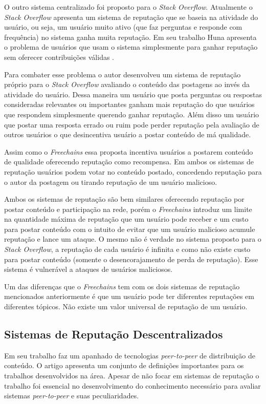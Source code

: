 \documentclass[12pt]{article}
\newcommand{\FC} {\emph{Freechains}\xspace}
\newcommand{\PtoP} {\emph{peer-to-peer}\xspace}
\begin{document}
O outro sistema centralizado foi proposto para o \emph{Stack Overflow}. Atualmente o \emph{Stack Overflow} apresenta um sistema de reputação que se baseia na atividade do usuário, ou seja, um usuário muito ativo (que faz perguntas e responde com frequência) no sistema ganha muita reputação. Em seu trabalho Huna apresenta o problema de usuários que usam o sistema simplesmente para ganhar reputação sem oferecer contribuições válidas \cite{huna2016exploiting}.

Para combater esse problema o autor desenvolveu um sistema de reputação próprio para o \emph{Stack Overflow} avaliando o conteúdo das postagens ao invés da atividade do usuário. Dessa maneira um usuário que posta perguntas ou respostas consideradas relevantes ou importantes ganham mais reputação do que usuários que respondem simplesmente querendo ganhar reputação. Além disso um usuário que postar uma resposta errado ou ruim pode perder reputação pela avaliação de outros usuários o que desincentiva usuário a postar conteúdo de má qualidade. 

Assim como o \FC essa proposta incentiva usuários a postarem conteúdo de qualidade oferecendo reputação como recompensa. Em ambos os sistemas de reputação usuários podem votar no conteúdo postado, concedendo reputação para o autor da postagem ou tirando reputação de um usuário malicioso. 

Ambos os sistemas de reputação são bem similares oferecendo reputação por postar conteúdo e participação na rede, porém o \FC introduz um limite na quantidade máxima de reputação que um usuário pode receber e um custo para postar conteúdo com o intuito de evitar que um usuário malicioso acumule reputação e lance um ataque. O mesmo não é verdade no sistema proposto para o \emph{Stack Overflow}, a reputação de cada usuário é infinita e como não existe custo para postar conteúdo (somente o desencorajamento de perda de reputação). Esse sistema é vulnerável a ataques de usuários maliciosos.

Um das diferenças que o \FC tem com os dois sistemas de reputação mencionados anteriormente é que um usuário pode ter diferentes reputações em diferentes tópicos. Não existe um valor universal de reputação de um usuário.  

\subsection{Sistemas de Reputação Descentralizados} \label{subsec:SRDescen}

Em seu trabalho \cite{10.1145/1041680.1041681} faz um apanhado de tecnologias \PtoP de distribuição de conteúdo. O artigo apresenta um conjunto de definições importantes para os trabalhos desenvolvidos na área. Apesar de não focar em sistemas de reputação o trabalho foi essencial no desenvolvimento do conhecimento necessário para avaliar sistemas \PtoP e suas peculiaridades.
\end{document}
